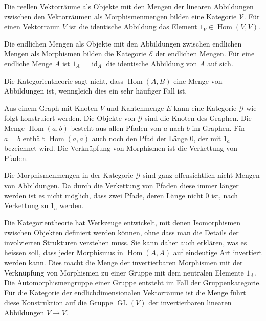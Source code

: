 \begin{beispiel}
Die reellen Vektorräume als Objekte mit den Mengen der linearen
Abbildungen zwischen den Vektorräumen als Morphismenmengen bilden
eine Kategorie $\mathscr{V}$.
Für einen Vektorraum $V$ ist die identische Abbildung das Element
$1_V\in\operatorname{Hom}(V,V)$.
\end{beispiel}

\begin{beispiel}
Die endlichen Mengen als Objekte mit den Abbildungen zwischen
endlichen Mengen als Morphismen bilden die Kategorie $\mathscr{E}$
der endlichen Mengen.
Für eine endliche Menge $A$ ist $1_A=\operatorname{id}_A$ die
identische Abbildung von $A$ auf sich.
\end{beispiel}

Die Kategorientheorie sagt nicht, dass $\operatorname{Hom}(A,B)$
eine Menge von Abbildungen ist, wenngleich dies ein sehr häufiger
Fall ist.

\begin{beispiel}
Aus einem Graph mit Knoten $V$ und Kantenmenge $E$ kann eine Kategorie
$\mathscr{G}$ wie folgt konstruiert werden.
Die Objekte von $\mathscr{G}$ sind die Knoten des Graphen.
Die Menge $\operatorname{Hom}(a,b)$ besteht aus allen Pfaden
von $a$ nach $b$ im Graphen.
Für $a=b$ enthält $\operatorname{Hom}(a,a)$ auch noch den Pfad der
Länge $0$, der mit $1_a$ bezeichnet wird.
Die Verknüpfung von Morphismen ist die Verkettung von Pfaden.

Die Morphismenmengen in der Kategorie $\mathscr{G}$ sind ganz offensichtlich
nicht Mengen von Abbildungen.
Da durch die Verkettung von Pfaden diese immer länger werden ist es
nicht möglich, dass zwei Pfade, deren Länge nicht $0$ ist, nach
Verkettung zu $1_a$ werden.
\end{beispiel}

Die Kategorientheorie hat Werkzeuge entwickelt, mit denen Isomorphismen
zwischen Objekten definiert werden können, ohne dass man die Details der
involvierten Strukturen verstehen muss.
Sie kann daher auch erklären, was es heissen soll, dass jeder 
Morphismus in $\operatorname{Hom}(A,A)$ auf eindeutige Art invertiert
werden kann.
Dies macht die Menge der invertierbaren Morphismen mit der Verknüpfung
von Morphismen zu einer Gruppe mit dem neutralen Elemente $1_A$.
Die Automorphismengruppe einer Gruppe entsteht im Fall der Gruppenkategorie.
Für die Kategorie der endlichdimensionalen Vektorräume ist die Menge
führt diese Konstruktion auf die Gruppe $\operatorname{GL}(V)$ der
invertierbaren linearen Abbildungen $V\to V$.




